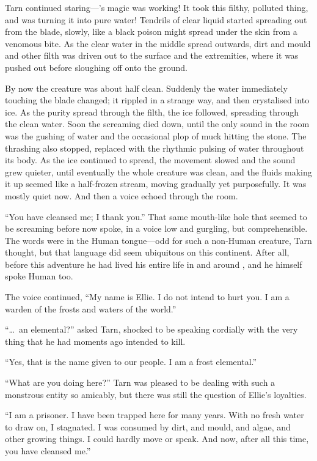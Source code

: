 Tarn continued staring---\kildir's magic was working!  It took this filthy, polluted thing, and was turning it into pure water!  Tendrils of clear liquid started spreading out from the blade, slowly, like a black poison might spread under the skin from a venomous bite.  As the clear water in the middle spread outwards, dirt and mould and other filth was driven out to the surface and the extremities, where it was pushed out before sloughing off onto the ground.

By now the creature was about half clean.  Suddenly the water immediately touching the blade changed; it rippled in a strange way, and then crystalised into ice.  As the purity spread through the filth, the ice followed, spreading through the clean water.  Soon the screaming died down, until the only sound in the room was the gushing of water and the occasional plop of muck hitting the stone.  The thrashing also stopped, replaced with the rhythmic pulsing of water throughout its body.  As the ice continued to spread, the movement slowed and the sound grew quieter, until eventually the whole creature was clean, and the fluids making it up seemed like a half-frozen stream, moving gradually yet purposefully.  It was mostly quiet now.  And then a voice echoed through the room.

``You have cleansed me; I thank you.''  That same mouth-like hole that seemed to be screaming before now spoke, in a voice low and gurgling, but comprehensible.  The words were in the Human tongue---odd for such a non-Human creature, Tarn thought, but that language did seem ubiquitous on this continent.  After all, before this adventure he had lived his entire life in and around \korbarthrond, and he himself spoke Human too.

The voice continued, ``My name is Ellie. I do not intend to hurt you.  I am a warden of the frosts and waters of the world.''

``\ldots\ an elemental?'' asked Tarn, shocked to be speaking cordially with the very thing that he had moments ago intended to kill.

``Yes, that is the name given to our people.  I am a frost elemental.''

``What are you doing here?''  Tarn was pleased to be dealing with such a monstrous entity so amicably, but there was still the question of Ellie's loyalties.

``I am a prisoner.  I have been trapped here for many years.  With no fresh water to draw on, I stagnated.  I was consumed by dirt, and mould, and algae, and other growing things.  I could hardly move or speak.  And now, after all this time, you have cleansed me.''

